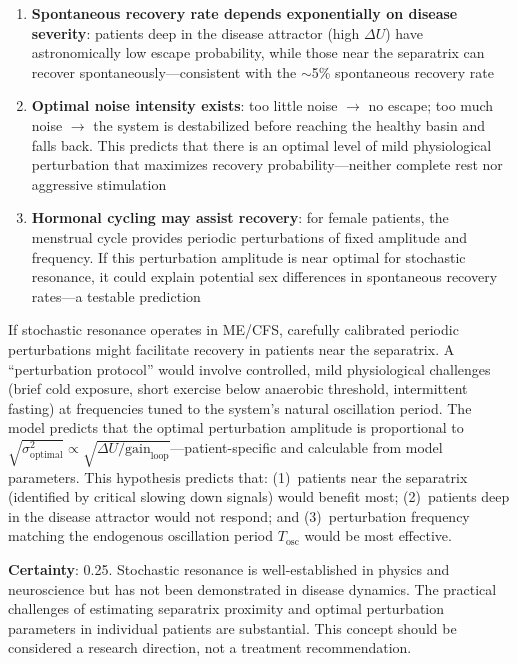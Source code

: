 \begin{enumerate}
    \item \textbf{Spontaneous recovery rate depends exponentially on disease severity}: patients deep in the disease attractor (high $\Delta U$) have astronomically low escape probability, while those near the separatrix can recover spontaneously---consistent with the $\sim$5\% spontaneous recovery rate
    \item \textbf{Optimal noise intensity exists}: too little noise $\to$ no escape; too much noise $\to$ the system is destabilized before reaching the healthy basin and falls back. This predicts that there is an optimal level of mild physiological perturbation that maximizes recovery probability---neither complete rest nor aggressive stimulation
    \item \textbf{Hormonal cycling may assist recovery}: for female patients, the menstrual cycle provides periodic perturbations of fixed amplitude and frequency. If this perturbation amplitude is near optimal for stochastic resonance, it could explain potential sex differences in spontaneous recovery rates---a testable prediction
\end{enumerate}

\begin{speculation}
If stochastic resonance operates in ME/CFS, carefully calibrated periodic perturbations might facilitate recovery in patients near the separatrix. A ``perturbation protocol'' would involve controlled, mild physiological challenges (brief cold exposure, short exercise below anaerobic threshold, intermittent fasting) at frequencies tuned to the system's natural oscillation period. The model predicts that the optimal perturbation amplitude is proportional to $\sqrt{\sigma^2_{\text{optimal}}} \propto \sqrt{\Delta U / \text{gain}_{\text{loop}}}$---patient-specific and calculable from model parameters. This hypothesis predicts that: (1)~patients near the separatrix (identified by critical slowing down signals) would benefit most; (2)~patients deep in the disease attractor would not respond; and (3)~perturbation frequency matching the endogenous oscillation period $T_{\text{osc}}$ would be most effective.

\textbf{Certainty}: 0.25. Stochastic resonance is well-established in physics and neuroscience but has not been demonstrated in disease dynamics. The practical challenges of estimating separatrix proximity and optimal perturbation parameters in individual patients are substantial. This concept should be considered a research direction, not a treatment recommendation.
\end{speculation}


